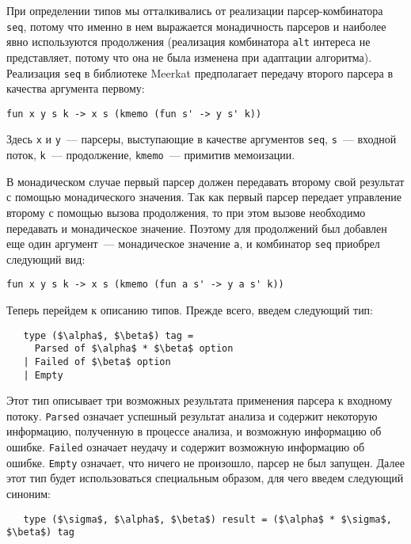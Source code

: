 \documentclass[conference]{IEEEtran}
\begin{document}
При определении типов мы отталкивались от реализации парсер-комбинатора \lstinline|seq|, потому что именно в нем выражается монадичность парсеров и наиболее явно используются продолжения
(реализация комбинатора \lstinline|alt| интереса не представляет, потому что она не была изменена при адаптации алгоритма). Реализация \lstinline|seq| в библиотеке Meerkat
предполагает передачу второго парсера в качества аргумента первому:

\begin{lstlisting}[basicstyle=\small]
   fun x y s k -> x s (kmemo (fun s' -> y s' k))
\end{lstlisting}

Здесь \lstinline|x| и \lstinline|y|~--- парсеры, выступающие в качестве аргументов \lstinline|seq|, \lstinline|s|~--- входной поток, \lstinline|k|~--- продолжение,
\lstinline|kmemo|~--- примитив мемоизации.

В монадическом случае первый парсер должен передавать второму свой результат с помощью монадического значения. Так как первый парсер передает управление второму с
помощью вызова продолжения, то при этом вызове необходимо передавать и монадическое значение. Поэтому для продолжений был добавлен еще один аргумент~--- монадическое
значение \lstinline|a|, и комбинатор \lstinline|seq| приобрел следующий вид:

\begin{lstlisting}[basicstyle=\small]
   fun x y s k -> x s (kmemo (fun a s' -> y a s' k))
\end{lstlisting}

Теперь перейдем к описанию типов. Прежде всего, введем следующий тип:

\begin{lstlisting}
   type ($\alpha$, $\beta$) tag =
     Parsed of $\alpha$ * $\beta$ option
   | Failed of $\beta$ option
   | Empty
\end{lstlisting}

Этот тип описывает три возможных результата применения парсера к входному потоку. \lstinline|Parsed| означает успешный результат анализа и содержит некоторую информацию, полученную в процессе
анализа, и возможную информацию об ошибке. \lstinline|Failed| означает неудачу и содержит возможную информацию об ошибке. \lstinline|Empty| означает, что ничего не произошло, парсер не был запущен.
Далее этот тип будет использоваться специальным образом, для чего введем следующий синоним:

\begin{lstlisting}
   type ($\sigma$, $\alpha$, $\beta$) result = ($\alpha$ * $\sigma$, $\beta$) tag
\end{lstlisting}
\end{document}
